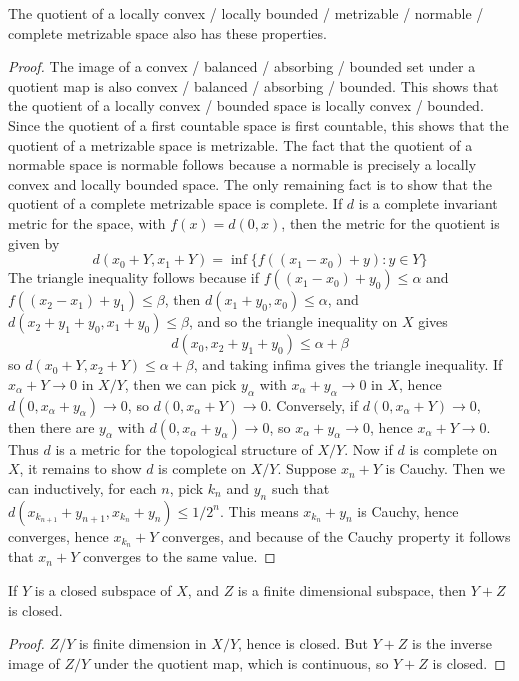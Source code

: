 \begin{theorem}
    The quotient of a locally convex / locally bounded / metrizable / normable / complete metrizable space also has these properties.
\end{theorem}
\begin{proof}
    The image of a convex / balanced / absorbing / bounded set under a quotient map is also convex / balanced / absorbing / bounded. This shows that the quotient of a locally convex / bounded space is locally convex / bounded. Since the quotient of a first countable space is first countable, this shows that the quotient of a metrizable space is metrizable. The fact that the quotient of a normable space is normable follows because a normable is precisely a locally convex and locally bounded space. The only remaining fact is to show that the quotient of a complete metrizable space is complete. If $d$ is a complete invariant metric for the space, with $f(x) = d(0,x)$, then the metric for the quotient is given by
    \[ d(x_0 + Y, x_1 + Y) = \inf \{ f((x_1 - x_0) + y) : y \in Y \} \]
    The triangle inequality follows because if $f((x_1 - x_0) + y_0) \leq \alpha$ and $f((x_2 - x_1) + y_1) \leq \beta$, then $d(x_1 + y_0, x_0) \leq \alpha$, and $d(x_2 + y_1 + y_0, x_1 + y_0) \leq \beta$, and so the triangle inequality on $X$ gives
    \[ d(x_0, x_2 + y_1 + y_0) \leq \alpha + \beta \]
    so $d(x_0 + Y, x_2 + Y) \leq \alpha + \beta$, and taking infima gives the triangle inequality. If $x_\alpha + Y \to 0$ in $X/Y$, then we can pick $y_\alpha$ with $x_\alpha + y_\alpha \to 0$ in $X$, hence $d(0, x_\alpha + y_\alpha) \to 0$, so $d(0,x_\alpha + Y) \to 0$. Conversely, if $d(0,x_\alpha + Y) \to 0$, then there are $y_\alpha$ with $d(0, x_\alpha + y_\alpha) \to 0$, so $x_\alpha + y_\alpha \to 0$, hence $x_\alpha + Y \to 0$. Thus $d$ is a metric for the topological structure of $X/Y$. Now if $d$ is complete on $X$, it remains to show $d$ is complete on $X/Y$. Suppose $x_n + Y$ is Cauchy. Then we can inductively, for each $n$, pick $k_n$ and $y_n$ such that $d(x_{k_{n+1}} + y_{n+1}, x_{k_n} + y_n) \leq 1/2^n$. This means $x_{k_n} + y_n$ is Cauchy, hence converges, hence $x_{k_n} + Y$ converges, and because of the Cauchy property it follows that $x_n + Y$ converges to the same value.
\end{proof}

\begin{corollary}
    If $Y$ is a closed subspace of $X$, and $Z$ is a finite dimensional subspace, then $Y + Z$ is closed.
\end{corollary}
\begin{proof}
    $Z/Y$ is finite dimension in $X/Y$, hence is closed. But $Y + Z$ is the inverse image of $Z/Y$ under the quotient map, which is continuous, so $Y + Z$ is closed.
\end{proof}








